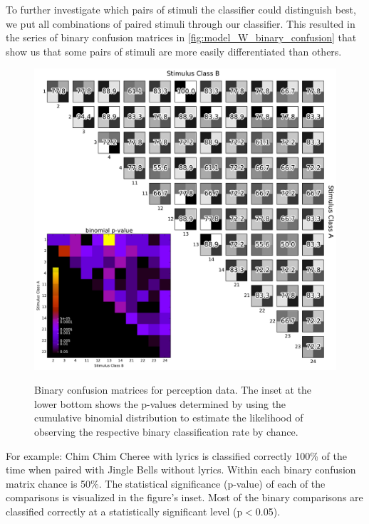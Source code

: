 To further investigate which pairs of stimuli the classifier could distinguish best, we put all combinations of paired stimuli through our classifier.
This resulted in the series of binary confusion matrices in \autoref{fig:model_W_binary_confusion} that show us that some pairs of stimuli are more easily differentiated than others. 
\begin{figure}[htb] 
  \begin{center}
    \includegraphics[width=.75\textwidth,keepaspectratio=true]{Figures/model_W_binary_confusion}
   \\\vspace{-0.8em}
    \caption{Binary confusion matrices for perception data.
    The inset at the lower bottom shows the p-values determined by using the cumulative binomial distribution to estimate the likelihood of observing the respective binary classification rate by chance.}
    \label{fig:model_W_binary_confusion}
  \end{center}
  \vspace{-1em}
\end{figure}
For example: Chim Chim Cheree with lyrics is classified correctly 100\% of the time when paired with Jingle Bells without lyrics. 
Within each binary confusion matrix chance is 50\%.
The statistical significance (p-value) of each of the comparisons is visualized in the figure's inset. 
Most of the binary comparisons are classified correctly at a statistically significant level (p$<$0.05). 

